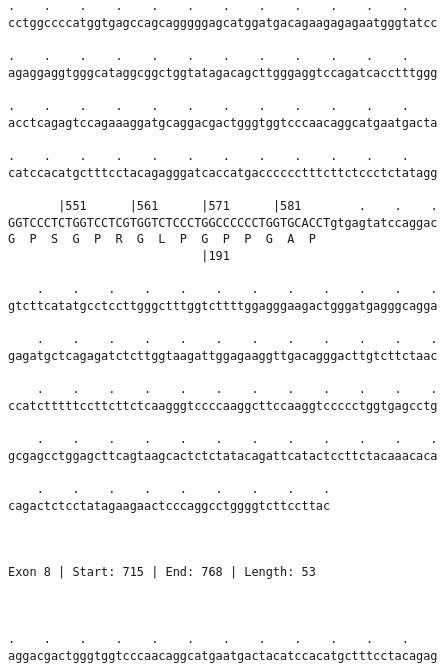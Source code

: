 \documentclass{article}
\begin{document}
\begin{Verbatim}
.    .    .    .    .    .    .    .    .    .    .    .    
cctggccccatggtgagccagcagggggagcatggatgacagaagagagaatgggtatcc
                                                            
.    .    .    .    .    .    .    .    .    .    .    .    
agaggaggtgggcataggcggctggtatagacagcttgggaggtccagatcacctttggg
                                                            
.    .    .    .    .    .    .    .    .    .    .    .    
acctcagagtccagaaaggatgcaggacgactgggtggtcccaacaggcatgaatgacta
                                                            
.    .    .    .    .    .    .    .    .    .    .    .    
catccacatgctttcctacagagggatcaccatgacccccctttcttctccctctatagg
                                                            
       |551      |561      |571      |581        .    .    .
GGTCCCTCTGGTCCTCGTGGTCTCCCTGGCCCCCCTGGTGCACCTgtgagtatccaggac
G  P  S  G  P  R  G  L  P  G  P  P  G  A  P                 
                           |191                             
  
    .    .    .    .    .    .    .    .    .    .    .    .
gtcttcatatgcctccttgggctttggtcttttggagggaagactgggatgagggcagga
                                                            
    .    .    .    .    .    .    .    .    .    .    .    .
gagatgctcagagatctcttggtaagattggagaaggttgacagggacttgtcttctaac
                                                            
    .    .    .    .    .    .    .    .    .    .    .    .
ccatctttttccttcttctcaagggtccccaaggcttccaaggtccccctggtgagcctg
                                                            
    .    .    .    .    .    .    .    .    .    .    .    .
gcgagcctggagcttcagtaagcactctctatacagattcatactccttctacaaacaca
                                                            
    .    .    .    .    .    .    .    .    .
cagactctcctatagaagaactcccaggcctggggtcttccttac
                                             
                                             
 
Exon 8 | Start: 715 | End: 768 | Length: 53



.    .    .    .    .    .    .    .    .    .    .    .    
aggacgactgggtggtcccaacaggcatgaatgactacatccacatgctttcctacagag
                                                            

\end{Verbatim}
\end{document}

